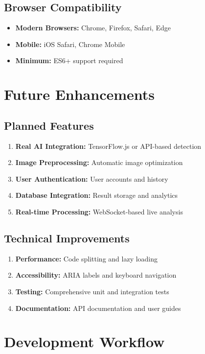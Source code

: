 \documentclass[12pt,a4paper]{article}
\begin{document}
\subsection{Browser Compatibility}
\begin{itemize}
    \item \textbf{Modern Browsers:} Chrome, Firefox, Safari, Edge
    \item \textbf{Mobile:} iOS Safari, Chrome Mobile
    \item \textbf{Minimum:} ES6+ support required
\end{itemize}

\section{Future Enhancements}

\subsection{Planned Features}
\begin{enumerate}
    \item \textbf{Real AI Integration:} TensorFlow.js or API-based detection
    \item \textbf{Image Preprocessing:} Automatic image optimization
    \item \textbf{User Authentication:} User accounts and history
    \item \textbf{Database Integration:} Result storage and analytics
    \item \textbf{Real-time Processing:} WebSocket-based live analysis
\end{enumerate}

\subsection{Technical Improvements}
\begin{enumerate}
    \item \textbf{Performance:} Code splitting and lazy loading
    \item \textbf{Accessibility:} ARIA labels and keyboard navigation
    \item \textbf{Testing:} Comprehensive unit and integration tests
    \item \textbf{Documentation:} API documentation and user guides
\end{enumerate}

\section{Development Workflow}
\end{document}
